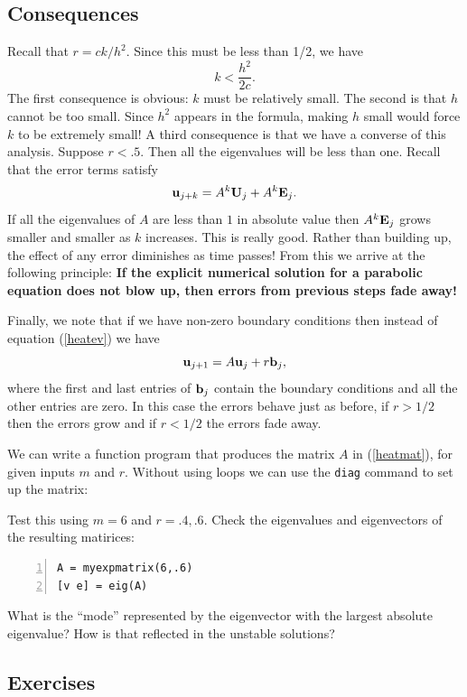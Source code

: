 
\subsection*{Consequences}

Recall that $r = ck/h^2$. Since this must be less than 1/2, we have
$$
        k < \frac{h^2}{2c}.
$$
The first consequence is obvious: $k$ must be relatively small.
%
The second is that $h$ cannot be too small. Since $h^2$ appears
in the formula, making $h$ small would force $k$ to be extremely
small!
%
A third consequence is that we have a converse of this
analysis. Suppose $r < .5$.
Then all the eigenvalues will be less than one. Recall that
the error terms satisfy
$$
    \mathbf{u}_{j+k} = A^k \mathbf{U}_j + A^k \mathbf{E}_j.
$$
If all the eigenvalues of $A$ are less than $1$ in absolute value then
$A^k \mathbf{E}_j$ grows smaller and smaller as $k$ increases. This
is really good. Rather than building up, the effect of any
error diminishes as time passes! From this we arrive at the following
principle: {\bf If the explicit numerical solution for a parabolic
equation does not blow up, then errors from previous steps fade away!}

Finally, we note that if we have non-zero boundary conditions
then instead of equation (\ref{heatev}) we have
\begin{equation}\label{heatev2}
     \mathbf{u}_{j+1} = A \mathbf{u}_j + r \mathbf{b}_j,
\end{equation}
where the first and last entries of $\mathbf{b}_j$ contain the boundary
conditions and all the other entries are zero. In this case the
errors behave just as before, if
$r> 1/2$ then the errors grow and if $r<1/2$ the errors
fade away.


We can write a function program  that produces the matrix
$A$ in (\ref{heatmat}), for given inputs $m$ and $r$.  Without using loops
we can use the \verb&diag& command to
set up the matrix:

Test this using $m=6$ and $r=.4, .6$. Check the eigenvalues and
eigenvectors of the resulting matirices:
\begin{lstlisting}[frame=none,numbers=left]
A = myexpmatrix(6,.6)
[v e] = eig(A)
\end{lstlisting}
What is the ``mode'' represented by the eigenvector with the largest absolute
eigenvalue? How is that reflected in the unstable solutions?


\subsection*{Exercises}

